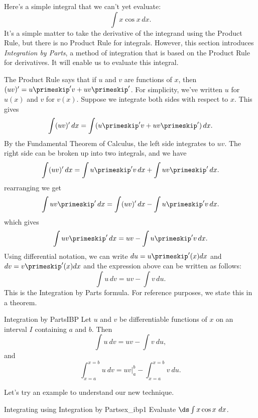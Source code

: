 Here's a simple integral that we can't yet evaluate:
$$\int x\cos x \,dx.$$
It's a simple matter to take the derivative of the integrand using the Product Rule, but there is no Product Rule for integrals.  However, this section introduces \textit{Integration by Parts}, a method of integration that is based on the Product Rule for derivatives. It will enable us to evaluate this integral.

The Product Rule says that if $u$ and $v$ are functions of $x$, then  $(uv)' = u\primeskip'v + uv\primeskip'$.  For simplicity, we've written $u$ for $u(x)$ and $v$ for $v(x)$.  Suppose we integrate both sides with respect to $x$.  This gives
$$\int (uv)'\,dx = \int (u\primeskip'v+uv\primeskip')\,dx.$$
By the Fundamental Theorem of Calculus, the left side integrates to $uv$.  The right side can be broken up into two integrals, and we have
$$\int (uv)'\,dx = \int u\primeskip'v\,dx + \int uv\primeskip'\,dx.$$
rearranging we get
$$\int uv\primeskip'\,dx = \int (uv)'\,dx - \int u\primeskip'v\,dx.$$
which gives 
$$\int uv\primeskip'\,dx = uv - \int u\primeskip'v\,dx.$$
Using differential notation, we can write $du = u\primeskip'(x)dx$ and $dv=v\primeskip'(x)dx$ and the expression above can be written as follows:
$$\int u\,dv = uv - \int v\,du.$$
This is the Integration by Parts formula. For reference purposes, we state this in a theorem.


\begin{theorem}{Integration by Parts}{IBP}
{Let $u$ and $v$ be differentiable functions of $x$ on an interval $I$ containing $a$ and $b$. Then 
	$$\int u\ dv = uv - \int v\ du,$$ and 
	$$\int_{x=a}^{x=b} u\ dv = uv\Big|_a^b - \int_{x=a}^{x=b}v\ du.$$
}
\end{theorem}


Let's try an example to understand our new technique.\\

\begin{example}{Integrating using Integration by Parts}{ex_ibp1}
	{
	Evaluate $\ds\int x\cos{x}\ dx$.}	
\end{example}	

